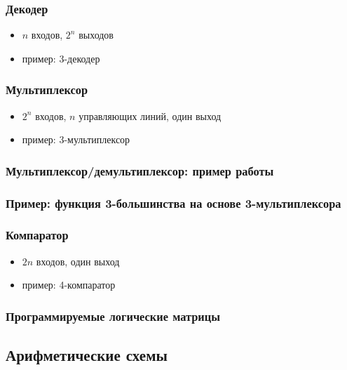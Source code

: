 \begin{frame}
\frametitle{Декодер}
\begin{itemize}
    \item $n$ входов, $2^n$ выходов
    \item пример: 3-декодер\\
    \vspace{-.1cm} \pause {}
\end{itemize}
\end{frame}

\begin{frame}
\frametitle{Мультиплексор}
\begin{itemize}
    \item $2^n$ входов, $n$ управляющих линий, один выход
    \item пример: 3-мультиплексор\\
    \pause {}
\end{itemize}
\end{frame}

\begin{frame}
\frametitle{Мультиплексор/демультиплексор: пример работы}
\centering
{}
\end{frame}

\begin{frame}
\frametitle{Пример: функция 3-большинства на основе 3-мультиплексора}
\end{frame}

\begin{frame}
\frametitle{Компаратор}
\begin{itemize}
    \item $2n$ входов, один выход
    \item \pause пример: 4-компаратор\\
\end{itemize}
\end{frame}

\begin{frame}[plain]
\frametitle{Программируемые логические матрицы}
\end{frame}

\subsection{Арифметические схемы}

